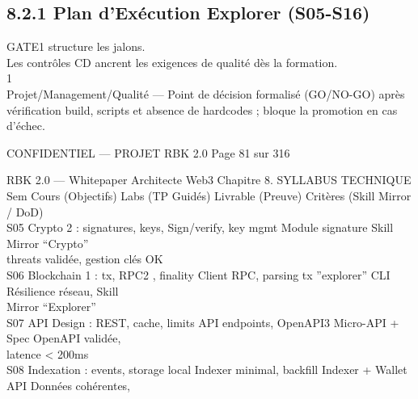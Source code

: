 \documentclass[12pt,landscape,a4paper]{article}
\newenvironment{confidential}
{\begin{tcolorbox}[
    colback=rbkred!5!white,
    colframe=rbkred!75!black,
    title=CONFIDENTIEL,
    fonttitle=\bfseries\color{white},
    coltitle=rbkred!75!black,
    breakable,
    enhanced,
    frame hidden,
    borderline west={2pt}{0pt}{rbkred!75!black}
]}
{\end{tcolorbox}}
\begin{document}
\subsection{8.2.1 Plan d’Exécution Explorer (S05-S16)}
GATE1 structure les jalons.\\
Les contrôles CD ancrent les exigences de qualité dès la formation.\\
\vspace{0.5em}
\vspace{0.5em}
\vspace{0.5em}
\vspace{0.5em}
1\\
Projet/Management/Qualité — Point de décision formalisé (GO/NO-GO) après vérification build, scripts et absence de hardcodes ; bloque la promotion en cas\\
d’échec.\\
\vspace{0.5em}
\vspace{0.5em}
\begin{confidential}CONFIDENTIEL — PROJET RBK 2.0                                               Page 81 sur 316\end{confidential}
RBK 2.0 — Whitepaper Architecte Web3                                                                                     Chapitre 8. SYLLABUS TECHNIQUE\\
\vspace{0.5em}
\vspace{0.5em}
Sem     Cours (Objectifs)                    Labs (TP Guidés)                   Livrable (Preuve)        Critères (Skill Mirror\\
/ DoD)\\
S05     Crypto 2 : signatures, keys,         Sign/verify, key mgmt              Module signature         Skill Mirror “Crypto”\\
threats                                                                                          validée, gestion clés OK\\
S06     Blockchain 1 : tx, RPC2 , finality   Client RPC, parsing tx             ”explorer” CLI           Résilience réseau, Skill\\
Mirror “Explorer”\\
S07     API Design : REST, cache, limits     API endpoints, OpenAPI3            Micro-API + Spec         OpenAPI validée,\\
latence \textless{} 200ms\\
S08     Indexation : events, storage local   Indexer minimal, backfill          Indexer + Wallet API     Données cohérentes,\\
\end{document}

